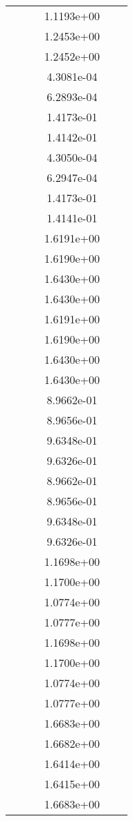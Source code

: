 \begin{xltabular}{\textwidth}{r|rS[table-format=1.3e+2]S[table-format=1.4e+2]S[table-format=1.4e+2]S[table-format=-1.5]}
&  &  & 1.1193e+00 & & \\
&  &  & 1.2453e+00 & & \\
&  &  & 1.2452e+00 & & \\
&  &  & 4.3081e-04 & & \\
&  &  & 6.2893e-04 & & \\
&  &  & 1.4173e-01 & & \\
&  &  & 1.4142e-01 & & \\
&  &  & 4.3050e-04 & & \\
&  &  & 6.2947e-04 & & \\
&  &  & 1.4173e-01 & & \\
&  &  & 1.4141e-01 & & \\
&  &  & 1.6191e+00 & & \\
&  &  & 1.6190e+00 & & \\
&  &  & 1.6430e+00 & & \\
&  &  & 1.6430e+00 & & \\
&  &  & 1.6191e+00 & & \\
&  &  & 1.6190e+00 & & \\
&  &  & 1.6430e+00 & & \\
&  &  & 1.6430e+00 & & \\
&  &  & 8.9662e-01 & & \\
&  &  & 8.9656e-01 & & \\
&  &  & 9.6348e-01 & & \\
&  &  & 9.6326e-01 & & \\
&  &  & 8.9662e-01 & & \\
&  &  & 8.9656e-01 & & \\
&  &  & 9.6348e-01 & & \\
&  &  & 9.6326e-01 & & \\
&  &  & 1.1698e+00 & & \\
&  &  & 1.1700e+00 & & \\
&  &  & 1.0774e+00 & & \\
&  &  & 1.0777e+00 & & \\
&  &  & 1.1698e+00 & & \\
&  &  & 1.1700e+00 & & \\
&  &  & 1.0774e+00 & & \\
&  &  & 1.0777e+00 & & \\
&  &  & 1.6683e+00 & & \\
&  &  & 1.6682e+00 & & \\
&  &  & 1.6414e+00 & & \\
&  &  & 1.6415e+00 & & \\
&  &  & 1.6683e+00 & & \\

\end{xltabular}
